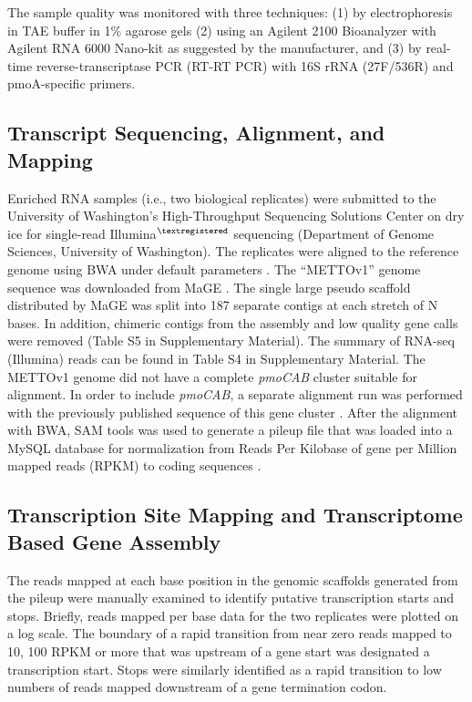 The sample quality was monitored with three techniques: (1) by electrophoresis in TAE buffer in 1\% agarose gels (2) using an Agilent 2100 Bioanalyzer with Agilent RNA 6000 Nano-kit as suggested by the manufacturer, and (3) by real-time reverse-transcriptase PCR (RT-RT PCR) with 16S rRNA (27F/536R) and pmoA-specific \cite{auman2001} primers.

\subsection{Transcript Sequencing, Alignment, and Mapping}
Enriched RNA samples (i.e., two biological replicates) were submitted to the University of Washington’s High-Throughput Sequencing Solutions Center on dry ice for single-read Illumina$^{\textregistered}$ sequencing (Department of Genome Sciences, University of Washington).
The replicates were aligned to the reference genome using BWA under default parameters \cite{li2009}.
The “METTOv1” genome sequence was downloaded from MaGE \cite{vallenet2006}.
The single large pseudo scaffold distributed by MaGE was split into 187 separate contigs at each stretch of N bases.
In addition, chimeric contigs from the assembly and low quality gene calls were removed (Table S5 in Supplementary Material).
The summary of RNA-seq (Illumina) reads can be found in Table S4 in Supplementary Material.
The METTOv1 genome did not have a complete \textit{pmoCAB} cluster suitable for alignment.
In order to include \textit{pmoCAB}, a separate alignment run was performed with the previously published sequence of this gene cluster \cite{holmes1995}.
After the alignment with BWA, SAM tools was used to generate a pileup file that was loaded into a MySQL database for normalization from Reads Per Kilobase of gene per Million mapped reads (RPKM) to coding sequences \cite{mortazavi2008}.

\subsection{Transcription Site Mapping and Transcriptome Based Gene Assembly}
The reads mapped at each base position in the genomic scaffolds generated from the pileup were manually examined to identify putative transcription starts and stops.
Briefly, reads mapped per base data for the two replicates were plotted on a log scale.
The boundary of a rapid transition from near zero reads mapped to 10, 100 RPKM or more that was upstream of a gene start was designated a transcription start.
Stops were similarly identified as a rapid transition to low numbers of reads mapped downstream of a gene termination codon.


